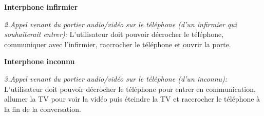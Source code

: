 \textbf{Interphone infirmier}
\newline 

\textit{2.Appel venant du portier audio/vidéo sur le téléphone (d’un infirmier qui souhaiterait entrer): }\newline 
L'utilisateur doit pouvoir décrocher le téléphone, communiquer avec l'infirmier, raccrocher le téléphone et ouvrir la porte.
\newline 

\textbf{Interphone inconnu}
\newline 

\textit{3.Appel venant du portier audio/vidéo sur le téléphone (d’un inconnu): }\newline 
L'utilisateur doit pouvoir décrocher le téléphone pour entrer en communication, allumer la TV pour voir la vidéo puis éteindre la TV et raccrocher le téléphone à la fin de la conversation.



 
